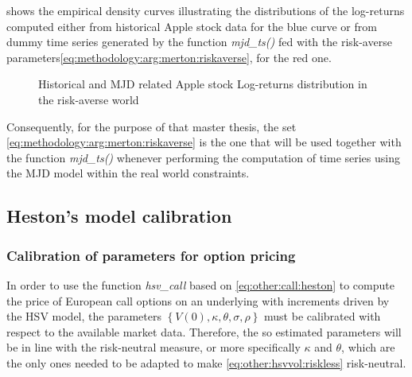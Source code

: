 \documentclass[12pt]{report}
\begin{document}
 shows the empirical density curves illustrating the distributions of the log-returns computed either from historical Apple stock data for the blue curve or from dummy time series generated by the function \textit{mjd\_ts()} fed with the risk-averse parameters\ref{eq:methodology:arg:merton:riskaverse}, for the red one.


\begin{figure}[ht]
  \centering
  
  \caption{Historical and MJD related Apple stock Log-returns distribution in the risk-averse world}
  \label{p:methodology:density:aapl:merton:riskaverse}
\end{figure}

Consequently, for the purpose of that master thesis, the set \ref{eq:methodology:arg:merton:riskaverse} is the one that will be used together with the function \textit{mjd\_ts()} whenever performing the computation of time series using the MJD model within the real world constraints.











%
%
%
%
%
%


\subsection{Heston's model calibration}
\label{sub:methodology:calibration:heston}

\subsubsection*{Calibration of parameters for option pricing}

In order to use the function \textit{hsv\_call} based on \cref{eq:other:call:heston} to compute the price of European call options on an underlying with increments driven by the HSV model, the parameters $\left\{ V(0), \kappa, \theta, \sigma, \rho \right\}$ must be calibrated with respect to the available market data.
Therefore, the so estimated parameters will be in line with the risk-neutral measure, or more specifically $\kappa$ and $\theta$, which are the only ones needed to be adapted to make \cref{eq:other:hsvvol:riskless} risk-neutral.
\end{document}
